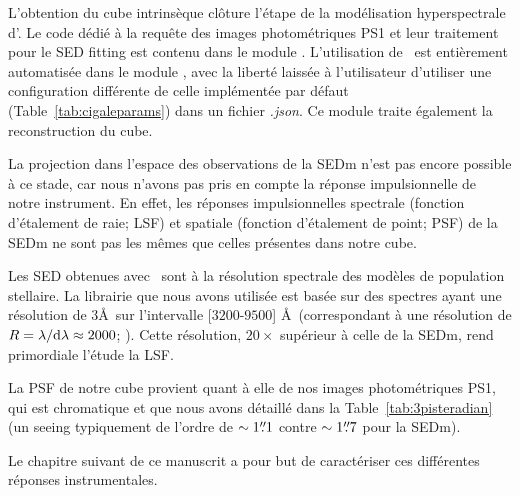 \documentclass[../main/main.tex]{subfiles}
\begin{document}
L'obtention du cube intrinsèque clôture l'étape de la modélisation hyperspectrale
d'\hypergal. Le code dédié à la requête des images photométriques PS1 et
leur traitement pour le SED fitting est contenu dans le module
. L'utilisation de \cigale\ est entièrement
automatisée dans le module , avec
la liberté laissée à l'utilisateur d'utiliser une configuration
différente de celle implémentée par défaut
(Table~\ref{tab:cigaleparams}) dans un fichier \textit{.json}. Ce
module traite également la reconstruction du cube.

La projection dans l'espace des observations de la SEDm n'est pas encore
possible à ce stade, car nous n'avons pas pris en compte la réponse
impulsionnelle de notre instrument. En effet, les réponses impulsionnelles spectrale
(fonction d'étalement de raie; LSF) et
spatiale (fonction d'étalement de point; PSF) de la SEDm ne sont pas
les mêmes que celles présentes dans notre cube.

Les SED obtenues avec
\cigale\ sont à la résolution spectrale des modèles de
population stellaire. La librairie  que nous avons utilisée
est basée sur des spectres ayant une résolution de $3$\AA\ sur
l'intervalle [$3200$-$9500$] \AA\ (correspondant à une résolution de
$R=\lambda/\mathrm{d}\lambda\approx2000$; \citet{BCO3}). Cette résolution,
$20\times$ supérieur à celle de la SEDm, rend primordiale l'étude la
LSF.

La PSF de notre cube provient quant à elle de nos images
photométriques PS1, qui est chromatique et que nous avons détaillé dans
la Table~\ref{tab:3pisteradian} (un seeing typiquement de l'ordre de
$\sim1\overset{\prime\prime}{.}1$ contre $\sim1\overset{\prime\prime}{.}7$ pour la SEDm).

Le chapitre suivant de
ce manuscrit a pour but de caractériser ces différentes réponses
instrumentales.

%
%
\end{document}
